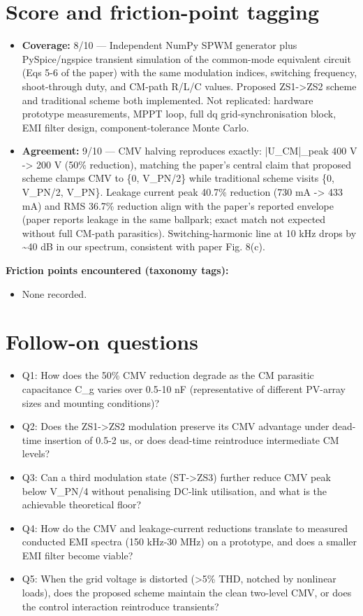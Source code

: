 \documentclass[11pt]{article}
\begin{document}
\section{Score and friction-point tagging}\label{sec:friction}
\begin{itemize}
\item \textbf{Coverage:} 8/10 --- Independent NumPy SPWM generator plus PySpice/ngspice transient simulation of the common-mode equivalent circuit (Eqs 5-6 of the paper) with the same modulation indices, switching frequency, shoot-through duty, and CM-path R/L/C values. Proposed ZS1-\textgreater{}ZS2 scheme and traditional scheme both implemented. Not replicated: hardware prototype measurements, MPPT loop, full dq grid-synchronisation block, EMI filter design, component-tolerance Monte Carlo.
\item \textbf{Agreement:} 9/10 --- CMV halving reproduces exactly: |U\_CM|\_peak 400 V -\textgreater{} 200 V (50\% reduction), matching the paper's central claim that proposed scheme clamps CMV to \{0, V\_PN/2\} while traditional scheme visits \{0, V\_PN/2, V\_PN\}. Leakage current peak 40.7\% reduction (730 mA -\textgreater{} 433 mA) and RMS 36.7\% reduction align with the paper's reported envelope (paper reports leakage in the same ballpark; exact match not expected without full CM-path parasitics). Switching-harmonic line at 10 kHz drops by \textasciitilde{}40 dB in our spectrum, consistent with paper Fig. 8(c).
\end{itemize}

\noindent\textbf{Friction points encountered (taxonomy tags):}
\begin{itemize}
\item None recorded.
\end{itemize}

\section{Follow-on questions}
\begin{itemize}
\item Q1: How does the 50\% CMV reduction degrade as the CM parasitic capacitance C\_g varies over 0.5-10 nF (representative of different PV-array sizes and mounting conditions)?
\item Q2: Does the ZS1-\textgreater{}ZS2 modulation preserve its CMV advantage under dead-time insertion of 0.5-2 us, or does dead-time reintroduce intermediate CM levels?
\item Q3: Can a third modulation state (ST-\textgreater{}ZS3) further reduce CMV peak below V\_PN/4 without penalising DC-link utilisation, and what is the achievable theoretical floor?
\item Q4: How do the CMV and leakage-current reductions translate to measured conducted EMI spectra (150 kHz-30 MHz) on a prototype, and does a smaller EMI filter become viable?
\item Q5: When the grid voltage is distorted (\textgreater{}5\% THD, notched by nonlinear loads), does the proposed scheme maintain the clean two-level CMV, or does the control interaction reintroduce transients?
\end{itemize}
\end{document}
